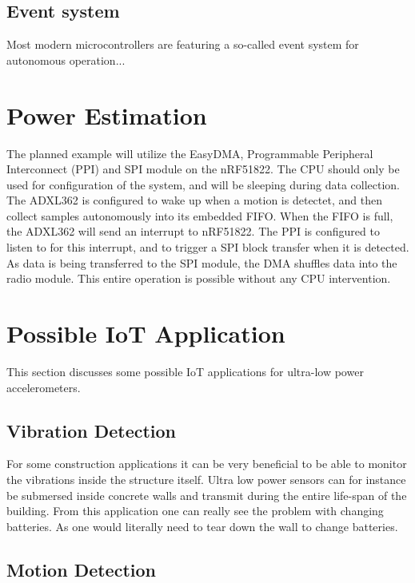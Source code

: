 \subsection{Event system}

Most modern microcontrollers are featuring a so-called event system for autonomous operation...

\section{Power Estimation}

The planned example will utilize the EasyDMA, Programmable Peripheral Interconnect (PPI) and SPI module on the nRF51822. The CPU should only be used for configuration of the system, and will be sleeping during data collection. The ADXL362 is configured to wake up when a motion is detectet, and then collect samples autonomously into its embedded FIFO. When the FIFO is full, the ADXL362 will send an interrupt to nRF51822. The PPI is configured to listen to for this interrupt, and to trigger a SPI block transfer when it is detected. As data is being transferred to the SPI module, the DMA shuffles data into the radio module. This entire operation is possible without any CPU intervention.

\section{Possible IoT Application}

This section discusses some possible IoT applications for ultra-low power accelerometers. 

\subsection{Vibration Detection}

For some construction applications it can be very beneficial to be able to monitor the vibrations inside the structure itself. Ultra low power sensors can for instance be submersed inside concrete walls and transmit during the entire life-span of the building. From this application one can really see the problem with changing batteries. As one would literally need to tear down the wall to change batteries. 

\subsection{Motion Detection}

